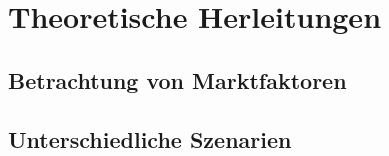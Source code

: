 \chapter{Theoretische Herleitungen}
\section{Betrachtung von Marktfaktoren}
\section{Unterschiedliche Szenarien}

